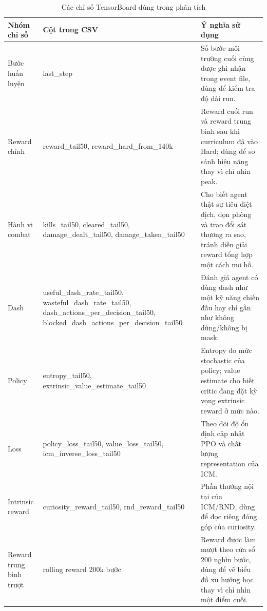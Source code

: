 \begin{table}[H]
    \centering
    \scriptsize
    \setlength{\tabcolsep}{3pt}
    \renewcommand{\arraystretch}{1.18}
    \caption{Các chỉ số TensorBoard dùng trong phân tích}
    \label{tab:tensorboard_metrics}
    \begin{tabular}{|>{\raggedright\arraybackslash}p{3.2cm}|>{\raggedright\arraybackslash}p{3.8cm}|>{\raggedright\arraybackslash}p{6.0cm}|}
        \hline
        \textbf{Nhóm chỉ số} & \textbf{Cột trong CSV} & \textbf{Ý nghĩa sử dụng} \\
        \hline
        Bước huấn luyện & last\_step & Số bước môi trường cuối cùng được ghi nhận trong event file, dùng để kiểm tra độ dài run. \\
        \hline
        Reward chính & reward\_tail50, reward\_hard\_from\_140k & Reward cuối run và reward trung bình sau khi curriculum đã vào Hard; dùng để so sánh hiệu năng thay vì chỉ nhìn peak. \\
        \hline
        Hành vi combat & kills\_tail50, cleared\_tail50, damage\_dealt\_tail50, damage\_taken\_tail50 & Cho biết agent thật sự tiêu diệt địch, dọn phòng và trao đổi sát thương ra sao, tránh diễn giải reward tổng hợp một cách mơ hồ. \\
        \hline
        Dash & useful\_dash\_rate\_tail50, wasteful\_dash\_rate\_tail50, dash\_actions\_per\_decision\_tail50, blocked\_dash\_actions\_per\_decision\_tail50 & Đánh giá agent có dùng dash như một kỹ năng chiến đấu hay chỉ gần như không dùng/không bị mask. \\
        \hline
        Policy & entropy\_tail50, extrinsic\_value\_estimate\_tail50 & Entropy đo mức stochastic của policy; value estimate cho biết critic đang đặt kỳ vọng extrinsic reward ở mức nào. \\
        \hline
        Loss & policy\_loss\_tail50, value\_loss\_tail50, icm\_inverse\_loss\_tail50 & Theo dõi độ ổn định cập nhật PPO và chất lượng representation của ICM. \\
        \hline
        Intrinsic reward & curiosity\_reward\_tail50, rnd\_reward\_tail50 & Phần thưởng nội tại của ICM/RND, dùng để đọc riêng đóng góp của curiosity. \\
        \hline
        Reward trung bình trượt & rolling reward 200k bước & Reward được làm mượt theo cửa sổ 200 nghìn bước, dùng để vẽ biểu đồ xu hướng học thay vì chỉ nhìn một điểm cuối. \\
        \hline
    \end{tabular}
\end{table}

